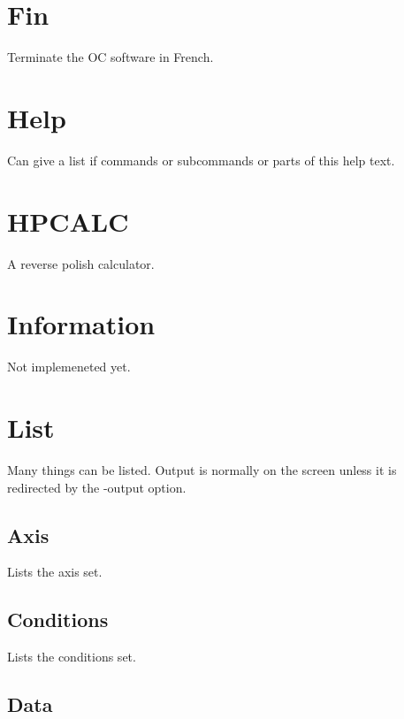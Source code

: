 \documentclass[12pt]{article}
\begin{document}
\section{Fin }

Terminate the OC software in French.

\section{Help }

Can give a list if commands or subcommands or parts of this help text.

\section{HPCALC }

A reverse polish calculator.

\section{Information }

Not implemeneted yet.

\section{List }

Many things can be listed.  Output is normally on the screen unless it
is redirected by the -output option.

\subsection{Axis}

Lists the axis set.

\subsection{Conditions}

Lists the conditions set.

\subsection{Data}
\end{document}
